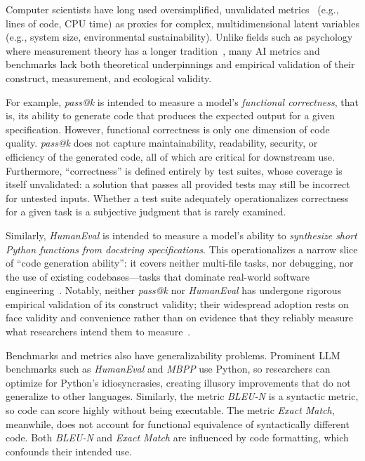 
Computer scientists have long used oversimplified, unvalidated metrics~\cite{DBLP:conf/ease/RalphT18} (e.g., lines of code, CPU time) as proxies for complex, multidimensional latent variables (e.g., system size, environmental sustainability). Unlike fields such as psychology where measurement theory has a longer tradition~\cite{borsboom2005measuring}, many AI metrics and benchmarks lack both theoretical underpinnings and empirical validation of their construct, measurement, and ecological validity.

For example, \emph{pass@k} is intended to measure a model's \textit{functional correctness}, that is, its ability to generate code that produces the expected output for a given specification. However, functional correctness is only one dimension of code quality. \emph{pass@k} does not capture maintainability, readability, security, or efficiency of the generated code, all of which are critical for downstream use. Furthermore, ``correctness'' is defined entirely by test suites, whose coverage is itself unvalidated: a solution that passes all provided tests may still be incorrect for untested inputs. Whether a test suite adequately operationalizes correctness for a given task is a subjective judgment that is rarely examined.

Similarly, \emph{HumanEval} is intended to measure a model's ability to \textit{synthesize short Python functions from docstring specifications}. This operationalizes a narrow slice of ``code generation ability'': it covers neither multi-file tasks, nor debugging, nor the use of existing codebases---tasks that dominate real-world software engineering~\cite{Chandra2025benchmarks, yang2025code}. Notably, neither \emph{pass@k} nor \emph{HumanEval} has undergone rigorous empirical validation of its construct validity; their widespread adoption rests on face validity and convenience rather than on evidence that they reliably measure what researchers intend them to measure~\cite{cao2025should}.

Benchmarks and metrics also have generalizability problems. Prominent LLM benchmarks such as \emph{HumanEval} and \emph{MBPP} use Python, so researchers can optimize for Python's idiosyncrasies, creating illusory improvements that do not generalize to other languages. Similarly, the metric \emph{BLEU-N} is a syntactic metric, so code can score highly without being executable. The metric \emph{Exact Match}, meanwhile, does not account for functional equivalence of syntactically different code. Both \emph{BLEU-N} and \emph{Exact Match} are influenced by code formatting, which confounds their intended use.

